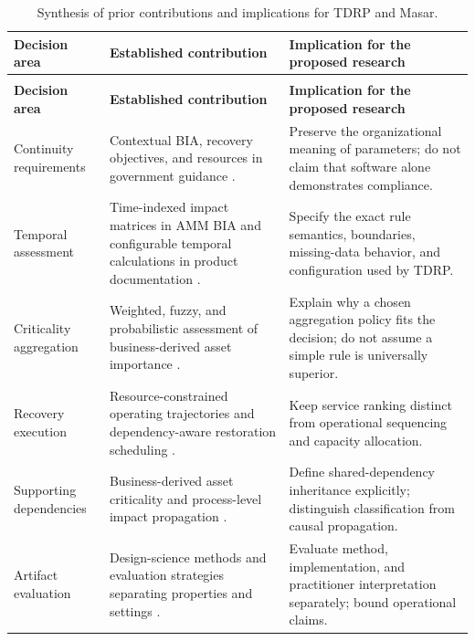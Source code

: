 \begingroup
\small
\setlength{\tabcolsep}{4pt}
\renewcommand{\arraystretch}{1.15}
\begin{longtable}{>{\raggedright\arraybackslash}p{3.0cm}>{\raggedright\arraybackslash}p{5.6cm}>{\raggedright\arraybackslash}p{5.9cm}}
\caption{Synthesis of prior contributions and implications for TDRP and Masar.}\label{tab:lr_synthesis}\\
\toprule
\textbf{Decision area} & \textbf{Established contribution} & \textbf{Implication for the proposed research} \\
\midrule
\endfirsthead
\multicolumn{3}{l}{Table \thetable\ continued}\\
\toprule
\textbf{Decision area} & \textbf{Established contribution} & \textbf{Implication for the proposed research} \\
\midrule
\endhead
\bottomrule
\endfoot
Continuity requirements & Contextual BIA, recovery objectives, and resources in government guidance \cite{nist2010contingency,dga2025guidelineen}. & Preserve the organizational meaning of parameters; do not claim that software alone demonstrates compliance. \\
Temporal assessment & Time-indexed impact matrices in AMM BIA and configurable temporal calculations in product documentation \cite{amm2023bia,globalsuite2025prebia,servicenow2025rto}. & Specify the exact rule semantics, boundaries, missing-data behavior, and configuration used by TDRP. \\
Criticality aggregation & Weighted, fuzzy, and probabilistic assessment of business-derived asset importance \cite{assetcriticality2023}. & Explain why a chosen aggregation policy fits the decision; do not assume a simple rule is universally superior. \\
Recovery execution & Resource-constrained operating trajectories and dependency-aware restoration scheduling \cite{sahebjamnia2015integrated,elshekeil2017precesion}. & Keep service ranking distinct from operational sequencing and capacity allocation. \\
Supporting dependencies & Business-derived asset criticality and process-level impact propagation \cite{quinn2025bia,nist2018criticality,raptaki2025propagation}. & Define shared-dependency inheritance explicitly; distinguish classification from causal propagation. \\
Artifact evaluation & Design-science methods and evaluation strategies separating properties and settings \cite{hevner2004design,peffers2007dsrm,venable2016feds}. & Evaluate method, implementation, and practitioner interpretation separately; bound operational claims. \\
\end{longtable}
\endgroup
